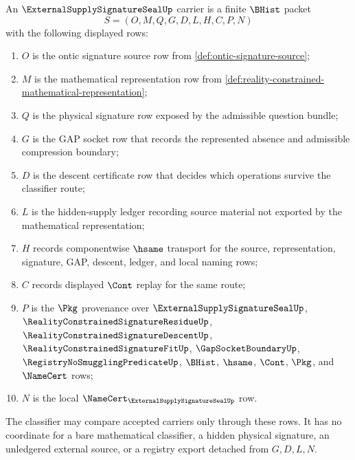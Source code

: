 \begin{definition}
\label{def:external-supply-signature-seal-carrier}
An $\ExternalSupplySignatureSealUp$ carrier is a finite $\BHist$ packet
$$
S=(O,M,Q,G,D,L,H,C,P,N)
$$
with the following displayed rows:
\begin{enumerate}
\item $O$ is the ontic signature source row from \autoref{def:ontic-signature-source};
\item $M$ is the mathematical representation row from \autoref{def:reality-constrained-mathematical-representation};
\item $Q$ is the physical signature row exposed by the admissible question bundle;
\item $G$ is the GAP socket row that records the represented absence and admissible compression boundary;
\item $D$ is the descent certificate row that decides which operations survive the classifier route;
\item $L$ is the hidden-supply ledger recording source material not exported by the mathematical representation;
\item $H$ records componentwise $\hsame$ transport for the source, representation, signature, GAP, descent, ledger, and local naming rows;
\item $C$ records displayed $\Cont$ replay for the same route;
\item $P$ is the $\Pkg$ provenance over $\ExternalSupplySignatureSealUp$, $\RealityConstrainedSignatureResidueUp$, $\RealityConstrainedSignatureDescentUp$, $\RealityConstrainedSignatureFitUp$, $\GapSocketBoundaryUp$, $\RegistryNoSmugglingPredicateUp$, $\BHist$, $\hsame$, $\Cont$, $\Pkg$, and $\NameCert$ rows;
\item $N$ is the local $\NameCert_{\ExternalSupplySignatureSealUp}$ row.
\end{enumerate}
The classifier may compare accepted carriers only through these rows. It has no coordinate for a bare mathematical classifier, a hidden physical signature, an unledgered external source, or a registry export detached from $G,D,L,N$.
\end{definition}

